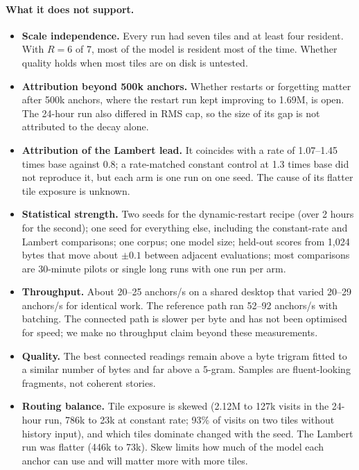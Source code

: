 \documentclass[10pt]{article}
\begin{document}
\paragraph{What it does not support.}
\begin{itemize}[leftmargin=*,itemsep=0pt,topsep=2pt]
\item \textbf{Scale independence.} Every run had seven tiles and at least four resident. With $R=6$ of
7, most of the model is resident most of the time. Whether quality holds when most tiles are on disk
is untested.
\item \textbf{Attribution beyond 500k anchors.} Whether restarts or forgetting matter after 500k
anchors, where the restart run kept improving to 1.69M, is open. The 24-hour run also differed in RMS
cap, so the size of its gap is not attributed to the decay alone.
\item \textbf{Attribution of the Lambert lead.} It coincides with a rate of 1.07--1.45 times base
against 0.8; a rate-matched constant control at 1.3 times base did not reproduce it, but each arm is
one run on one seed. The cause of its flatter tile exposure is unknown.
\item \textbf{Statistical strength.} Two seeds for the dynamic-restart recipe (over 2 hours for the
second); one seed for everything else, including the constant-rate and Lambert comparisons; one corpus;
one model size; held-out scores from 1,024 bytes that move about $\pm0.1$ between adjacent
evaluations; most comparisons are 30-minute pilots or single long runs with one run per arm.
\item \textbf{Throughput.} About 20--25 anchors/s on a shared desktop that varied 20--29 anchors/s for
identical work. The reference path ran 52--92 anchors/s with batching. The connected path is slower
per byte and has not been optimised for speed; we make no throughput claim beyond these measurements.
\item \textbf{Quality.} The best connected readings remain above a byte trigram fitted to a similar
number of bytes and far above a 5-gram. Samples are fluent-looking fragments, not coherent stories.
\item \textbf{Routing balance.} Tile exposure is skewed (2.12M to 127k visits in the 24-hour run,
786k to 23k at constant rate; 93\% of visits on two tiles without history input), and which tiles
dominate changed with the seed. The Lambert run was flatter (446k to 73k). Skew limits how much of the model each anchor
can use and will matter more with more tiles.
\end{itemize}
\end{document}
